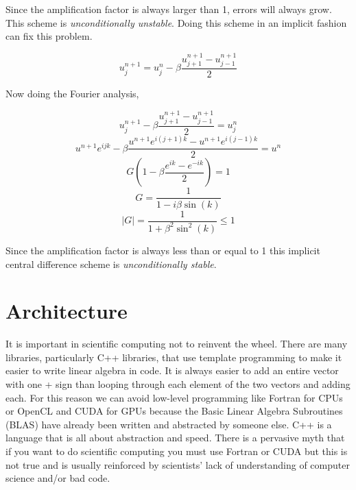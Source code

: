 \documentclass[12pt,upcase]{umlthesis}
\begin{document}
Since the amplification factor is always larger than 1, errors will always grow. This scheme is {\it unconditionally unstable}. Doing this scheme in an implicit fashion can fix this problem.

\begin{equation}\label{eq:implicitcentral}
	u^{n+1}_j = u^n_j - \beta \frac{u^{n+1}_{j+1}-u^{n+1}_{j-1}}{2}
\end{equation}

Now doing the Fourier analysis,

\begin{equation}
	u^{n+1}_j - \beta \frac{u^{n+1}_{j+1}-u^{n+1}_{j-1}}{2} = u^n_j
\end{equation}
\begin{equation}
	u^{n+1}e^{ijk} - \beta \frac{u^{n+1}e^{i(j+1)k}-u^{n+1}e^{i(j-1)k}}{2} = u^n
\end{equation}
\begin{equation}
	G (1 - \beta \frac{e^{ik}-e^{-ik}}{2}) = 1
\end{equation}
\begin{equation}
	G  = \frac{1}{1 - i \beta \sin{(k)}} 
\end{equation}
\begin{equation}
\lvert G \rvert = \frac{1}{1+\beta^2 \sin^2{(k)}} \leq 1
\end{equation}

Since the amplification factor is always less than or equal to 1 this implicit central difference scheme is {\it unconditionally stable}.

\section{Architecture}\label{sec:architecture}

It is important in scientific computing not to reinvent the wheel. There are many libraries, particularly C++ libraries, that use template programming to make it easier to write linear algebra in code. It is always easier to add an entire vector with one + sign than looping through each element of the two vectors and adding each. For this reason we can avoid low-level programming like Fortran for CPUs or OpenCL and CUDA for GPUs because the Basic Linear Algebra Subroutines (BLAS) have already been written and abstracted by someone else. C++ is a language that is all about abstraction and speed. There is a pervasive myth that if you want to do scientific computing you must use Fortran or CUDA but this is not true and is usually reinforced by scientists' lack of understanding of computer science and/or bad code.
\end{document}
